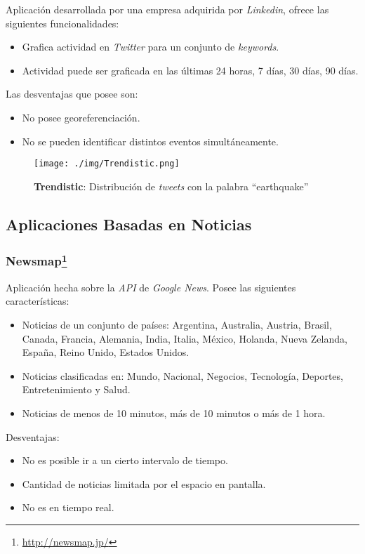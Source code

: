 \documentclass[10pt]{article}
\begin{document}
Aplicación desarrollada por una empresa adquirida por \emph{Linkedin}, ofrece las siguientes funcionalidades:

\begin{itemize}
	\item Grafica actividad en \emph{Twitter} para un conjunto de \emph{keywords}.
	\item Actividad puede ser graficada en las últimas 24 horas, 7 días, 30 días, 90 días.
\end{itemize}

Las desventajas que posee son:

\begin{itemize}
	\item No posee georeferenciación.
	\item No se pueden identificar distintos eventos simultáneamente.
\end{itemize}

\begin{figure}[h!]
	\centering
    \texttt{[image: ./img/Trendistic.png]}
	\caption{\textbf{Trendistic}: Distribución de \emph{tweets} con la palabra ``earthquake''}
	\label{trendistic}
\end{figure}

\subsection{Aplicaciones Basadas en Noticias}
\subsubsection*{Newsmap\footnote{\url{http://newsmap.jp/}}}

Aplicación hecha sobre la \emph{API} de \emph{Google News}. Posee las siguientes características:

\begin{itemize}
	\item Noticias de un conjunto de países: Argentina, Australia, Austria, Brasil, Canada, Francia, Alemania, India, Italia, México, Holanda, Nueva Zelanda, España, Reino Unido, Estados Unidos.
	\item Noticias clasificadas en: Mundo, Nacional, Negocios, Tecnología, Deportes, Entretenimiento y Salud.
	\item Noticias de menos de 10 minutos, más de 10 minutos o más de 1 hora.
\end{itemize}

Desventajas:

\begin{itemize}
	\item No es posible ir a un cierto intervalo de tiempo.
	\item Cantidad de noticias limitada por el espacio en pantalla.
	\item No es en tiempo real.
\end{itemize}
\end{document}
